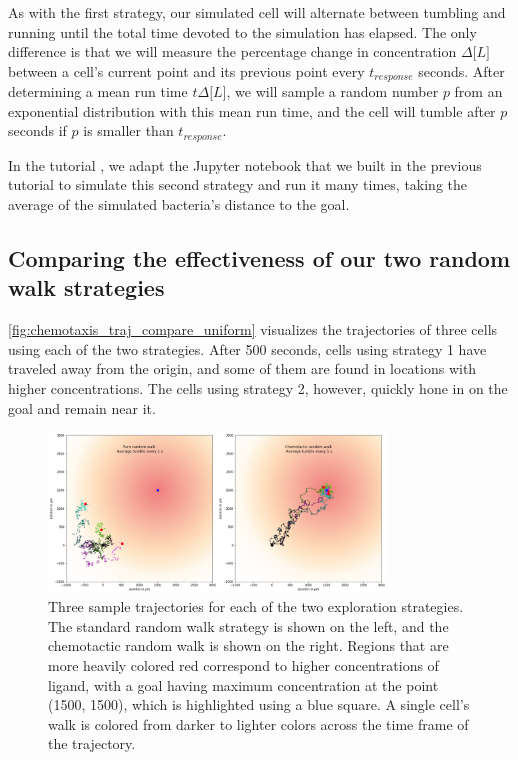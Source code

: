 \begin{qbox}\end{qbox}

As with the first strategy, our simulated cell will alternate between tumbling and running until the total time devoted to the simulation has elapsed. The only difference is that we will measure the percentage change in concentration $\Delta\text{[}L{]}$ between a cell's current point and its previous point every $t_{response}$ seconds. After determining a mean run time $t\Delta\text{[}L{]}$, we will sample a random number $p$ from an exponential distribution with this mean run time, and the cell will tumble after $p$ seconds if $p$ is smaller than $t_{response}$.

In the tutorial , we adapt the Jupyter notebook that we built in the previous tutorial to simulate this second strategy and run it many times, taking the average of the simulated bacteria's distance to the goal.

\FloatBarrier
{}
{}
\subsection{Comparing the effectiveness of our two random walk strategies}

\autoref{fig:chemotaxis_traj_compare_uniform} visualizes the trajectories of three cells using each of the two strategies. After 500 seconds, cells using strategy 1 have traveled away from the origin, and some of them are found in locations with higher concentrations. The cells using strategy 2, however, quickly hone in on the goal and remain near it.

\begin{figure}[h]
\centering
\mySfFamily
\includegraphics[width = 0.8\textwidth]{../images/chemotaxis_traj_compare_uniform.png}
\caption{Three sample trajectories for each of the two exploration strategies. The standard random walk strategy is shown on the left, and the chemotactic random walk is shown on the right. Regions that are more heavily colored red correspond to higher concentrations of ligand, with a goal having maximum concentration at the point (1500, 1500), which is highlighted using a blue square. A single cell's walk is colored from darker to lighter colors across the time frame of the trajectory.}
\label{fig:chemotaxis_traj_compare_uniform}
\end{figure}


